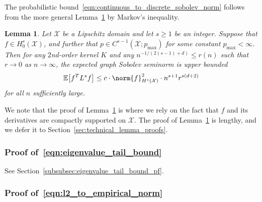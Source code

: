 \documentclass{article}
\newcommand{\1}{\mathbf{1}}
\newcommand{\Xset}{\mathcal{X}}
\newcommand{\Ebb}{\mathbb{E}}
\theoremstyle{alden}
\theoremstyle{aldenthm}
\newtheorem{lemma}{Lemma}
\theoremstyle{definition}
\theoremstyle{remark}
\begin{document}
The probabilistic bound~\eqref{eqn:continuous_to_discrete_sobolev_norm} follows from the more general Lemma~\ref{lem:roughness_functional_expectation_sobolev} by Markov's inequality. 
\begin{lemma}
	\label{lem:roughness_functional_expectation_sobolev}
	Let $\Xset$ be a Lipschitz domain and let $s \geq 1$ be an integer. Suppose that $f \in H_0^{s}(\Xset)$, and further that $p \in C^{s-1}(\Xset;p_{\max})$ for some constant $p_{\max} < \infty$. Then for any $2$nd-order kernel $K$ and any $n^{-1/(2(s - 1) + d)} \leq r(n)$ such that $r \to 0$ as $n \to \infty$, the expected graph Sobolev seminorm is upper bounded
	\begin{equation}
	\label{eqn:roughness_functional_expectation_sobolev}
	\Ebb\bigl[f^T L^s f\bigr] \leq c \cdot \norm{f}_{H^s(\Xset)}^2 \cdot n^{s + 1}r^{s(d + 2)}
	\end{equation}
	for all $n$ sufficiently large.
\end{lemma}

We note that the proof of Lemma~\ref{lem:roughness_functional_expectation_sobolev} is where we rely on the fact that $f$ and its derivatives are compactly supported on $\Xset$. The proof of Lemma~\ref{lem:roughness_functional_expectation_sobolev} is lengthy, and we defer it to Section~\ref{sec:technical_lemma_proofs}.

\subsubsection{Proof of~\eqref{eqn:eigenvalue_tail_bound}}
See Section~\ref{subsubsec:eigenvalue_tail_bound_pf}.

\subsubsection{Proof of~\eqref{eqn:l2_to_empirical_norm}}
\end{document}
